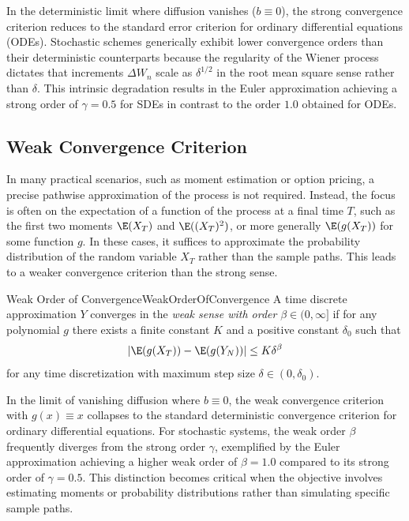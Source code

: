 \begin{xtip}
In the deterministic limit where diffusion vanishes (\(b \equiv 0\)), the strong convergence criterion reduces to the standard error criterion for ordinary differential equations (ODEs). Stochastic schemes generically exhibit lower convergence orders than their deterministic counterparts because the regularity of the Wiener process dictates that increments \(\Delta W_n\) scale as \(\delta^{1/2}\) in the root mean square sense rather than \(\delta\). This intrinsic degradation results in the Euler approximation achieving a strong order of \(\gamma = 0.5\) for SDEs in contrast to the order \(1.0\) obtained for ODEs.
\end{xtip}

\subsection{Weak Convergence Criterion}
In many practical scenarios, such as moment estimation or option pricing, a precise pathwise approximation of the \Ito{} process is not required. Instead, the focus is often on the expectation of a function of the process at a final time \(T\), such as the first two moments \(\E(X_T)\) and \(\E((X_T)^2)\), or more generally \(\E(g(X_T))\) for some function \(g\). In these cases, it suffices to approximate the probability distribution of the random variable \(X_T\) rather than the sample paths. This leads to a weaker convergence criterion than the strong sense.

\begin{defn}{Weak Order of Convergence}{WeakOrderOfConvergence}
A time discrete approximation \(Y\) converges in the \textit{weak sense with order} \(\beta \in (0, \infty]\) if for any polynomial \(g\) there exists a finite constant \(K\) and a positive constant \(\delta_0\) such that
\begin{equation}
    |\E(g(X_T)) - \E(g(Y_N))| \le K \delta^\beta
    \label{eq:WeakConvergenceOrder}
\end{equation}
for any time discretization with maximum step size \(\delta \in (0, \delta_0)\).
\end{defn}

\begin{xtip}
In the limit of vanishing diffusion where \(b \equiv 0\), the weak convergence criterion with \(g(x) \equiv x\) collapses to the standard deterministic convergence criterion for ordinary differential equations. For stochastic systems, the weak order \(\beta\) frequently diverges from the strong order \(\gamma\), exemplified by the Euler approximation achieving a higher weak order of \(\beta = 1.0\) compared to its strong order of \(\gamma = 0.5\). This distinction becomes critical when the objective involves estimating moments or probability distributions rather than simulating specific sample paths.
\end{xtip}

